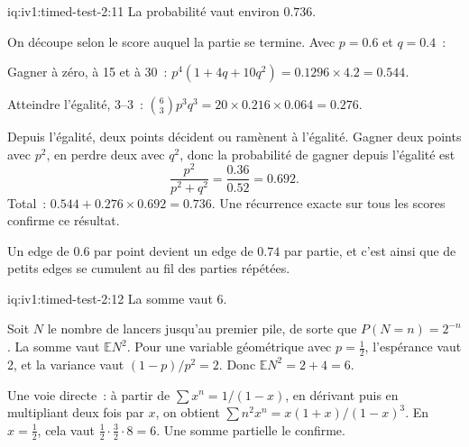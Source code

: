 \begin{solution}{iq:iv1:timed-test-2:11}
La probabilité vaut environ $0.736$.

On découpe selon le score auquel la partie se termine. Avec $p = 0.6$ et $q = 0.4$~:

Gagner à zéro, à 15 et à 30~: $p^4(1 + 4q + 10q^2) = 0.1296 \times 4.2 = 0.544$.

Atteindre l'égalité, 3--3~: $\binom63p^3q^3 = 20 \times 0.216 \times 0.064 = 0.276$.

Depuis l'égalité, deux points décident ou ramènent à l'égalité. Gagner deux points avec $p^2$, en perdre deux avec $q^2$, donc la probabilité de gagner depuis l'égalité est
\[
\frac{p^2}{p^2 + q^2} = \frac{0.36}{0.52} = 0.692.
\]
Total~: $0.544 + 0.276 \times 0.692 = 0.736$. Une récurrence exacte sur tous les scores confirme ce résultat.

Un edge de $0.6$ par point devient un edge de $0.74$ par partie, et c'est ainsi que de petits edges se cumulent au fil des parties répétées.

\end{solution}

\begin{solution}{iq:iv1:timed-test-2:12}
La somme vaut 6.

Soit $N$ le nombre de lancers jusqu'au premier pile, de sorte que $P(N = n) = 2^{-n}$. La somme vaut $\mathbb{E}N^2$. Pour une variable géométrique avec $p = \frac12$, l'espérance vaut 2, et la variance vaut $(1 - p)/p^2 = 2$. Donc $\mathbb{E}N^2 = 2 + 4 = 6$.

Une voie directe~: à partir de $\sum x^n = 1/(1 - x)$, en dérivant puis en multipliant deux fois par $x$, on obtient $\sum n^2x^n = x(1 + x)/(1 - x)^3$. En $x = \frac12$, cela vaut $\frac12 \cdot \frac32 \cdot 8 = 6$. Une somme partielle le confirme.


\end{solution}
